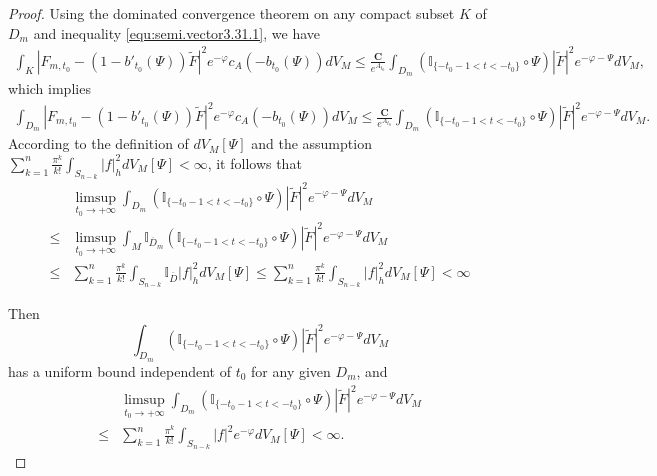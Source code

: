 \begin{proof}
Using the dominated convergence theorem on any compact subset $K$ of
$D_m$ and inequality \ref{equ:semi.vector3.31.1}, we have
\begin{equation}
\begin{split}
\int_{K}|F_{m,t_0}-(1-b'_{t_0}(\Psi))\tilde{F}|^{2}e^{-\varphi}c_{A}(-b_{t_0}(\Psi))dV_{M}
\leq\frac{\mathbf{C}}{e^{A_{t_0}}}\int_{D_m}(\mathbb{I}_{\{-t_{0}-1< t<-t_{0}\}}
\circ\Psi)|\tilde{F}|^{2}e^{-\varphi-\Psi}dV_{M},
\end{split}
\end{equation}
which implies
\begin{equation}
\label{equ:vector3.4}
\begin{split}
\int_{ D_m}|F_{m,t_0}-(1-b'_{t_0}(\Psi))\tilde{F}|^{2}e^{-\varphi}c_{A}(-b_{t_0}(\Psi))dV_{M}
\leq\frac{\mathbf{C}}{e^{A_{t_0}}}\int_{D_m}(\mathbb{I}_{\{-t_{0}-1< t<-t_{0}\}}
\circ\Psi)|\tilde{F}|^{2}e^{-\varphi-\Psi}dV_{M}.
\end{split}
\end{equation}
According to the definition of $dV_{M}[\Psi]$ and the assumption
$\sum_{k=1}^{n}\frac{\pi^{k}}{k!}\int_{S_{n-k}}|f|^{2}_{h}dV_{M}[\Psi]<\infty$,
it follows that
\begin{equation}
\label{equ:vector3.6}
\begin{split}
&\limsup_{t_{0}\to+\infty}\int_{D_m}(\mathbb{I}_{\{-t_{0}-1< t<-t_{0}\}}
\circ\Psi)|\tilde{F}|^{2}e^{-\varphi-\Psi}dV_{M}
\\\leq&
\limsup_{t_{0}\to+\infty}\int_{M}\mathbb{I}_{\overline{D}_{m}}(\mathbb{I}_{\{-t_{0}-1<t<-t_{0}\}}
\circ\Psi)|\tilde{F}|^{2}e^{-\varphi-\Psi}dV_{M}
\\\leq&\sum_{k=1}^{n}\frac{\pi^{k}}{k!}\int_{S_{n-k}}\mathbb{I}_{\overline{D}}|f|^{2}_{h}dV_{M}[\Psi]
\leq\sum_{k=1}^{n}\frac{\pi^{k}}{k!}\int_{S_{n-k}}|f|^{2}_{h}dV_{M}[\Psi]<\infty
\end{split}
\end{equation}

Then
$$\int_{D_m}(\mathbb{I}_{\{-t_{0}-1< t<-t_{0}\}}\circ\Psi)|\tilde{F}|^{2}e^{-\varphi-\Psi}dV_{M}$$
has a uniform bound independent of $t_{0}$ for any given $D_m$, and
\begin{equation}
\label{equ:vector3.7}
\begin{split}
&\limsup_{t_{0}\to+\infty}\int_{D_m}(\mathbb{I}_{\{-t_{0}-1< t<-t_{0}\}}
\circ\Psi)|\tilde{F}|^{2}e^{-\varphi-\Psi}dV_{M}
\\\leq&\sum_{k=1}^{n}\frac{\pi^{k}}{k!}\int_{S_{n-k}}|f|^{2}e^{-\varphi}dV_{M}[\Psi]<\infty.
\end{split}
\end{equation}


\end{proof}
